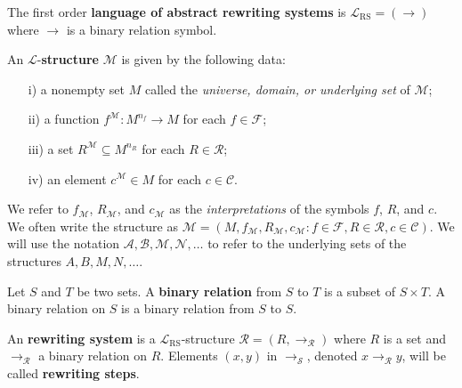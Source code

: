 \begin{definition}
  \label{def:l_ars}
  The first order \textbf{language of abstract rewriting systems} is $\mathcal{L}_\text{RS} = (\rightarrow)$ where $\rightarrow$ is a binary relation symbol.
\end{definition}
\begin{definition}
  An \( \mathcal{L} \)-\textbf{structure} \( \mathcal{M} \) is given by the following data:
 \begin{itemize}
     \item[i)] a nonempty set \( M \) called the \textit{universe, domain, or underlying set} of \( \mathcal{M} \);
     \item[ii)] a function \( f^{\mathcal{M}} : M^{n_f} \to M \) for each \( f \in \mathcal{F} \);
     \item[iii)] a set \( R^{\mathcal{M}} \subseteq M^{n_R} \) for each \( R \in \mathcal{R} \);
     \item[iv)] an element \( c^{\mathcal{M}} \in M \) for each \( c \in \mathcal{C} \).
 \end{itemize}
\end{definition}
We refer to \( f_{\mathcal{M}} \), \( R_{\mathcal{M}} \), and \( c_{\mathcal{M}} \) as the \textit{interpretations} of the symbols \( f \), \( R \), and \( c \). We often write the structure as \( \mathcal{M} = (M, f_{\mathcal{M}}, R_{\mathcal{M}}, c_{\mathcal{M}} : f \in \mathcal{F}, R \in \mathcal{R}, c \in \mathcal{C}) \). We will use the notation \( \mathcal{A}, \mathcal{B}, \mathcal{M}, \mathcal{N}, \dots \) to refer to the underlying sets of the structures \( A, B, M, N, \dots \).
\begin{definition}
  Let $S$ and $T$ be two sets. A \textbf{binary relation} from $S$ to $T$ is a subset of $S \times T$. A binary relation on $S$ is a binary relation from $S$ to $S$.
\end{definition} 

\begin{definition}
  \label{def:ars}
  An \textbf{rewriting system} is a $\mathcal{L}_\text{RS}$-structure $\mathcal{R} = (R,\to_\mathcal{R})$ where $R$ is a set and $\to_\mathcal{R}$ a binary relation on $R$. Elements $(x,y)$ in $\rightarrow_\mathcal{S}$, denoted $x \rightarrow_\mathcal{R} y$, will be called \textbf{rewriting steps}. 
\end{definition}

